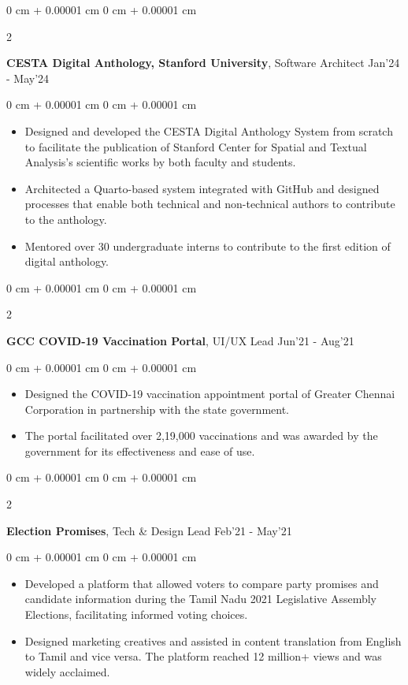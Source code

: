 \documentclass[10pt, letterpaper]{article}
\newenvironment{highlights}{
    \begin{itemize}[
        topsep=0.10 cm,
        parsep=0.10 cm,
        partopsep=0pt,
        itemsep=0pt,
        leftmargin=0 cm + 10pt
    ]
}{
    \end{itemize}
} %
\newenvironment{onecolentry}{
    \begin{adjustwidth}{
        0 cm + 0.00001 cm
    }{
        0 cm + 0.00001 cm
    }
}{
    \end{adjustwidth}
} %
\newenvironment{twocolentry}[2][]{
    \onecolentry
    \def\secondColumn{#2}
    \setcolumnwidth{\fill, 4.5 cm}
    \begin{paracol}{2}
}{
    \switchcolumn \raggedleft \secondColumn
    \end{paracol}
    \endonecolentry
} %
\newcommand{\datetext}[1]{\color{gray800}#1}
\newcommand{\socialimpactprojectentry}[3]{
    \begin{twocolentry}{
        \datetext{#3}
    }
        \textbf{#1}, #2\end{twocolentry}

    \vspace{0.10 cm}
}
\newcommand{\itemspacing}[1]{\vspace{0.275 cm}#1}
\begin{document}
        \socialimpactprojectentry{CESTA Digital Anthology, Stanford University}{Software Architect}{Jan'24 - May'24}
            \begin{onecolentry}
                \begin{highlights}
                    \item  Designed and developed the CESTA Digital Anthology System from scratch to facilitate the publication of Stanford Center for Spatial and Textual Analysis's scientific works by both faculty and students.
                    \item Architected a Quarto-based system integrated with GitHub and designed processes that enable both technical and non-technical authors to contribute to the anthology.
                    \item Mentored over 30 undergraduate interns to contribute to the first edition of digital anthology.
                \end{highlights}
            \end{onecolentry}
        
        \itemspacing
        
        \socialimpactprojectentry{GCC COVID-19 Vaccination Portal}{UI/UX Lead}{Jun'21 - Aug'21}
            \begin{onecolentry}
                \begin{highlights}
                    \item  Designed the COVID-19 vaccination appointment portal of Greater Chennai Corporation in partnership with the state government.
                    \item The portal facilitated over 2,19,000 vaccinations and was awarded by the government for its effectiveness and ease of use. 
                \end{highlights}
            \end{onecolentry}
        
        \itemspacing

        \socialimpactprojectentry{Election Promises}{Tech \& Design Lead}{Feb'21 - May'21}
            \begin{onecolentry}
                \begin{highlights}
                    \item  Developed a platform that allowed voters to compare party promises and candidate information during the Tamil Nadu 2021 Legislative Assembly Elections, facilitating informed voting choices.
                    \item Designed marketing creatives and assisted in content translation from English to Tamil and vice versa. The platform reached 12 million+ views and was widely acclaimed. 
                \end{highlights}
            \end{onecolentry}
\end{document}
